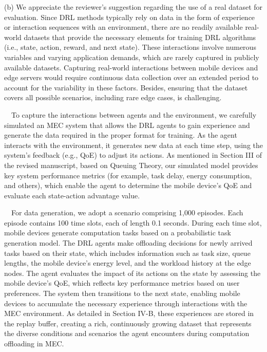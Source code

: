 \documentclass[12pt,draftclsnofoot,onecolumn]{IEEEtran}
\newenvironment{my}[2]%
{\begin{list}{}%
{\setlength{\rightmargin}{#1}\setlength{\leftmargin}{#2}}%


 \item[]{}

} {\end{list}}
\begin{document}
\begin{enumerate}
\begin{my}{1cm}{1cm}
\end{my}\vspace{6mm}






(b) We appreciate the reviewer’s suggestion regarding the use of a real dataset for evaluation. Since DRL methods typically rely on data in the form of experience or interaction sequences with an environment, there are no readily available real-world datasets that provide the necessary elements for training DRL algorithms (i.e., state, action, reward, and next state). These interactions involve numerous variables and varying application demands, which are rarely captured in publicly available datasets. Capturing real-world interactions between mobile devices and edge servers would require continuous data collection over an extended period to account for the variability in these factors. Besides, ensuring that the dataset covers all possible scenarios, including rare edge cases, is challenging.\vspace{2mm}





\,\,\,\, To capture the interactions between agents and the environment, we carefully simulated an MEC system that allows the DRL agents to gain experience and generate the data required in the proper format for training. As the agent interacts with the environment, it generates new data at each time step, using the system’s feedback (e.g., QoE) to adjust its actions. As mentioned in Section III of the revised manuscript, based on Queuing Theory, our simulated model provides key system performance metrics (for example, task delay, energy consumption, and others), which enable the agent to determine the mobile device's QoE and evaluate each state-action advantage value.\vspace{2mm}



\,\,\,\, For data generation, we adopt a scenario comprising 1,000 episodes. Each episode contains 100 time slots, each of length 0.1 seconds. During each time slot, mobile devices generate computation tasks based on a probabilistic task generation model. The DRL agents make offloading decisions for newly arrived tasks based on their state, which includes information such as task size, queue lengths, the mobile device’s energy level, and the workload history at the edge nodes. The agent evaluates the impact of its actions on the state by assessing the mobile device's QoE, which reflects key performance metrics based on user preferences. The system then transitions to the next state, enabling mobile devices to accumulate the necessary experience through interactions with the MEC environment. As detailed in Section IV-B, these experiences are stored in the replay buffer, creating a rich, continuously growing dataset that represents the diverse conditions and scenarios the agent encounters during computation offloading in MEC.\vspace{2mm}


\end{enumerate}
\end{document}
